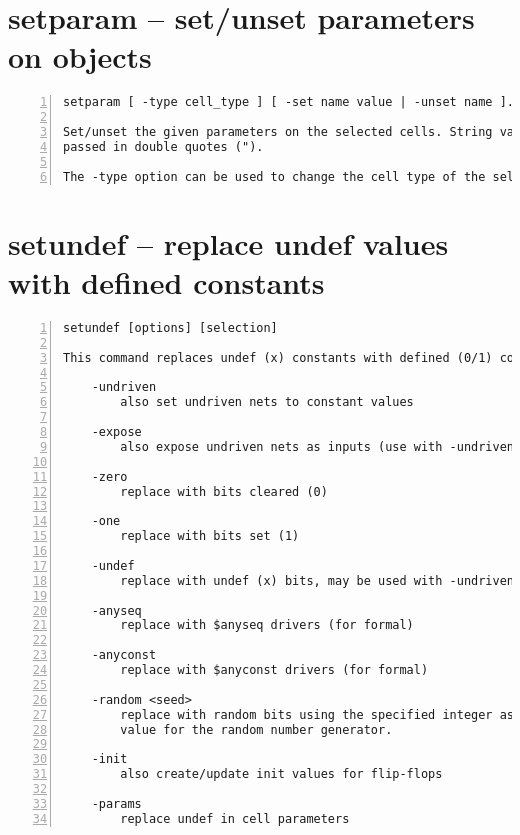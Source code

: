 \section{setparam -- set/unset parameters on objects}
\label{cmd:setparam}
\begin{lstlisting}[numbers=left,frame=single]
    setparam [ -type cell_type ] [ -set name value | -unset name ]... [selection]

Set/unset the given parameters on the selected cells. String values must be
passed in double quotes (").

The -type option can be used to change the cell type of the selected cells.
\end{lstlisting}

\section{setundef -- replace undef values with defined constants}
\label{cmd:setundef}
\begin{lstlisting}[numbers=left,frame=single]
    setundef [options] [selection]

This command replaces undef (x) constants with defined (0/1) constants.

    -undriven
        also set undriven nets to constant values

    -expose
        also expose undriven nets as inputs (use with -undriven)

    -zero
        replace with bits cleared (0)

    -one
        replace with bits set (1)

    -undef
        replace with undef (x) bits, may be used with -undriven

    -anyseq
        replace with $anyseq drivers (for formal)

    -anyconst
        replace with $anyconst drivers (for formal)

    -random <seed>
        replace with random bits using the specified integer as seed
        value for the random number generator.

    -init
        also create/update init values for flip-flops

    -params
        replace undef in cell parameters
\end{lstlisting}

